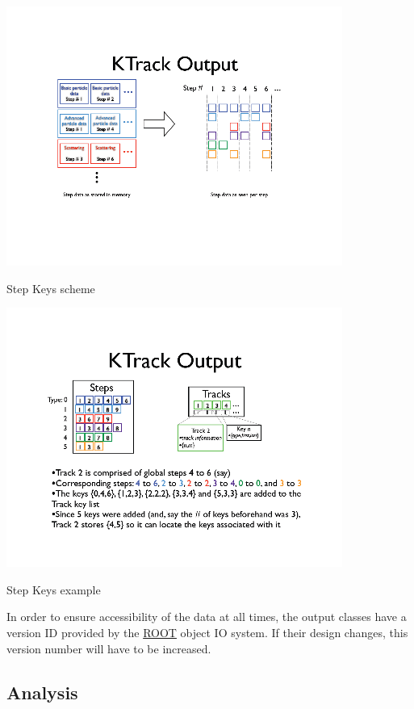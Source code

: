 \begin{DoxyImage}
\includegraphics[width=\textwidth]{images/Output_fig2}
\caption{Step Keys scheme}
\end{DoxyImage}
 


\begin{DoxyImage}
\includegraphics[width=\textwidth]{images/Output_fig3}
\caption{Step Keys example}
\end{DoxyImage}
 

In order to ensure accessibility of the data at all times, the output classes have a version ID provided by the \hyperlink{namespace_r_o_o_t}{ROOT} object IO system. If their design changes, this version number will have to be increased.\hypertarget{_k_s_output_KSAnalysis}{}\subsection{Analysis}\label{_k_s_output_KSAnalysis}


